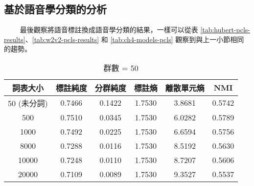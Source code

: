 \subsection{基於語音學分類的分析}

　　
最後觀察將語音標註換成語音學分類的結果，一樣可以從表 \ref{tab:hubert-pcls-results}、\ref{tab:w2v2-pcls-results} 和 \ref{tab:ch4-models-pcls} 觀察到與上一小節相同的趨勢。

        \begin{table}[!htbp]
            \centering
            \begin{subtable}[t]{\textwidth}
                \centering
                \begin{tabular}{|c|c|c|c|c|c|} \hline 
                        詞表大小  & 標註純度 & 分群純度 & 標註熵 & 離散單元熵 &     NMI   \\ \hline 
                       50 (未分詞)&   0.7466  &  0.1422 & 1.7530 &   3.8681 &  0.5742 \\ \hline 
                           500    &  0.7510  &  0.0345  & 1.7530 &  6.0282  &     0.5789  \\ \hline 
                          1000    &  0.7492  &  0.0225  & 1.7530 &  6.6594  &     0.5756  \\ \hline 
                          8000    &  0.7288  &  0.0116  & 1.7530 &  8.5192  &     0.5630  \\ \hline 
                         10000    &  0.7248  &  0.0110  & 1.7530 &  8.7207  &     0.5606  \\ \hline 
                         20000    &  0.7109  &  0.0089  & 1.7530 &  9.3527  &     0.5537  \\ \hline 
                \end{tabular}
\caption{群數 = 50}
                \label{tab:ch4-hubert-pcls-clu050}
            \end{subtable}        

            \jefftablesep        


\end{table}
